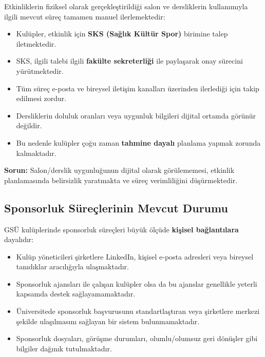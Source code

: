 \documentclass[a4paper,12pt]{report}
\begin{document}
Etkinliklerin fiziksel olarak gerçekleştirildiği salon ve dersliklerin kullanımıyla ilgili mevcut süreç tamamen manuel ilerlemektedir:

\begin{itemize}
    \item Kulüpler, etkinlik için \textbf{SKS (Sağlık Kültür Spor)} birimine talep iletmektedir.

    \item SKS, ilgili talebi ilgili \textbf{fakülte sekreterliği} ile paylaşarak onay sürecini yürütmektedir.

    \item Tüm süreç e-posta ve bireysel iletişim kanalları üzerinden ilerlediği için takip edilmesi zordur.

    \item Dersliklerin doluluk oranları veya uygunluk bilgileri dijital ortamda görünür değildir.

    \item Bu nedenle kulüpler çoğu zaman \textbf{tahmine dayalı} planlama yapmak zorunda kalmaktadır.
\end{itemize}

\textbf{Sorun:} Salon/derslik uygunluğunun dijital olarak görülememesi, etkinlik planlamasında belirsizlik yaratmakta ve süreç verimliliğini düşürmektedir.

\subsection{Sponsorluk Süreçlerinin Mevcut Durumu}

GSÜ kulüplerinde sponsorluk süreçleri büyük ölçüde \textbf{kişisel bağlantılara} dayalıdır:

\begin{itemize}
    \item Kulüp yöneticileri şirketlere LinkedIn, kişisel e-posta adresleri veya bireysel tanıdıklar aracılığıyla ulaşmaktadır.

    \item Sponsorluk ajansları ile çalışan kulüpler olsa da bu ajanslar genellikle yeterli kapsamda destek sağlayamamaktadır.

    \item Üniversitede sponsorluk başvurusunu standartlaştıran veya şirketlere merkezi şekilde ulaşılmasını sağlayan bir sistem bulunmamaktadır.

    \item Sponsorluk dosyaları, görüşme durumları, olumlu/olumsuz geri dönüşler gibi bilgiler dağınık tutulmaktadır.
\end{itemize}
\end{document}
